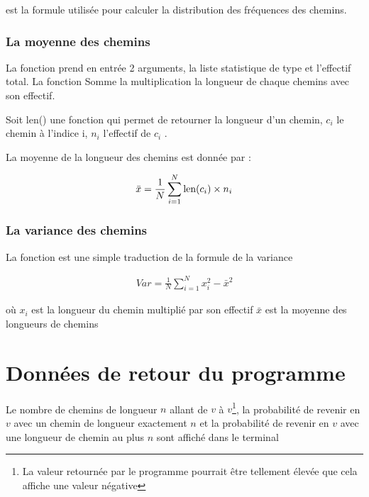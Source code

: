 \documentclass[a4paper, 11pt, oneside]{article}
\begin{document}
				est la formule utilisée pour calculer la distribution des fréquences des chemins.
			\subsubsection{La moyenne des chemins}
				La fonction  prend en entrée 2 arguments,  la liste statistique de type  et  l'effectif total. La fonction Somme la multiplication la longueur de chaque chemins avec son effectif.
				
				Soit len() une fonction qui permet de retourner la longueur d'un chemin, $c_i$ le chemin à l'indice i, $n_i$ l'effectif de $c_i$ .
				
				La moyenne de la longueur des chemins est donnée par :
				
				\begin{ceqn}
					\begin{align*}
						\bar{x} = \frac{1}{N} \sum_{i=1}^{N} \textnormal{len}(c_i) \times n_i
					\end{align*}
				\end{ceqn}
				
			\subsubsection{La variance des chemins}
				La fonction  est une simple traduction de la formule de la variance
				
				\begin{ceqn}
					\begin{align*}
						Var =  \frac{1}{N}	\sum_{i = 1}^{N} x_i^{2} - \bar{x}^2
					\end{align*}
				\end{ceqn}
		où $x_i$ est la longueur du chemin multiplié par son effectif $\bar{x}$ est la moyenne des longueurs de chemins
		
		\section{Données de retour du programme}
		
		Le nombre de chemins de longueur $n$ allant de $v$ à $v$\footnote{La valeur retournée par le programme pourrait être tellement élevée que cela affiche une valeur négative},
		la probabilité de revenir en $v$ avec un chemin de longueur exactement $n$ et la probabilité de revenir en $v$ avec une longueur de chemin au plus $n$ sont affiché dans le terminal
		
\end{document}
